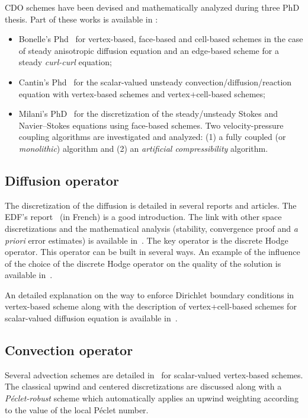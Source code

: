 CDO schemes have been devised and mathematically analyzed during three PhD
thesis. Part of these works is available in \CS:
\begin{itemize}
\item Bonelle's Phd~\cite{Bonel14} for vertex-based, face-based and cell-based
  schemes in the case of steady anisotropic diffusion equation and an
  edge-based scheme for a steady \emph{curl-curl} equation;
\item Cantin's Phd~\cite{Cant16} for the scalar-valued unsteady
  convection/diffusion/reaction equation with vertex-based schemes and
  vertex+cell-based schemes;
\item Milani's PhD~\cite{Mila20} for the discretization of the steady/unsteady
  Stokes and Navier--Stokes equations using face-based schemes. Two
  velocity-pressure coupling algorithms are investigated and analyzed: (1) a
  fully coupled (or \textit{monolithic}) algorithm and (2) an
  \textit{artificial compressibility} algorithm.
\end{itemize}

\subsection{Diffusion operator}

The discretization of the diffusion is detailed in several reports and
articles. The EDF's report~\cite{Bonel12} (in French) is a good
introduction. The link with other space discretizations and the mathematical
analysis (stability, convergence proof and \emph{a priori} error estimates) is
available in~\cite{BonEr14}. The key operator is the discrete Hodge
operator. This operator can be built in several ways. An example of the
influence of the choice of the discrete Hodge operator on the quality of the
solution is available in~\cite{BDPE15}.

An detailed explanation on the way to enforce Dirichlet boundary conditions in
vertex-based scheme along with the description of vertex+cell-based schemes for
scalar-valued diffusion equation is available in~\cite{Cant16}.

\subsection{Convection operator}

Several advection schemes are detailed in~\cite{Cant16} for scalar-valued
vertex-based schemes. The classical upwind and centered discretizations are
discussed along with a \emph{P\'eclet-robust} scheme which automatically
applies an upwind weighting according to the value of the local P\'eclet
number.

